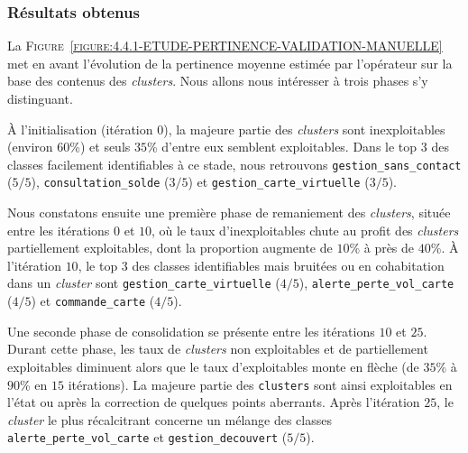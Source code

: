 		\subsubsection{Résultats obtenus}
		
			La \textsc{Figure~\ref{figure:4.4.1-ETUDE-PERTINENCE-VALIDATION-MANUELLE}} met en avant l'évolution de la pertinence moyenne estimée par l'opérateur sur la base des contenus des \textit{clusters}.
			Nous allons nous intéresser à trois phases s'y distinguant.
			
			À l'initialisation (itération $0$), la majeure partie des \textit{clusters} sont inexploitables (environ $60$\%) et seuls $35$\% d'entre eux semblent exploitables.
			Dans le top $3$ des classes facilement identifiables à ce stade, nous retrouvons \texttt{gestion\_sans\_contact} ($5/5$), \texttt{consultation\_solde} ($3/5$) et \texttt{gestion\_carte\_virtuelle} ($3/5$).
			
			Nous constatons ensuite une première phase de remaniement des \textit{clusters}, située entre les itérations $0$ et $10$, où le taux d'inexploitables chute au profit des \textit{clusters} partiellement exploitables, dont la proportion augmente de $10$\% à près de $40$\%.
			À l'itération $10$, le top $3$ des classes identifiables mais bruitées ou en cohabitation dans un \textit{cluster} sont \texttt{gestion\_carte\_virtuelle} ($4/5$),  \texttt{alerte\_perte\_vol\_carte} ($4/5$) et  \texttt{commande\_carte} ($4/5$).
			
			Une seconde phase de consolidation se présente entre les itérations $10$ et $25$.
			Durant cette phase, les taux de \textit{clusters} non exploitables et de partiellement exploitables diminuent alors que le taux d'exploitables monte en flèche (de $35$\% à $90$\% en $15$ itérations).
			La majeure partie des \texttt{clusters} sont ainsi exploitables en l'état ou après la correction de quelques points aberrants.
			Après l'itération $25$, le \textit{cluster} le plus récalcitrant concerne un mélange des classes \texttt{alerte\_perte\_vol\_carte} et \texttt{gestion\_decouvert} ($5/5$).


